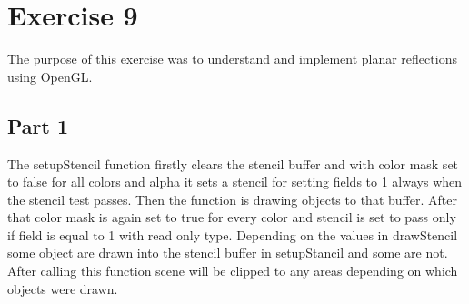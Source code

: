\chapter{Exercise 9}
The purpose of this exercise was to understand and implement planar reflections using OpenGL.

\section{Part 1}
The setupStencil function firstly clears the stencil buffer and with
color mask set to false for all colors and alpha it sets a stencil 
for setting fields to 1 always when the stencil test passes. 
Then the function is drawing objects to that buffer. After that
color mask is again set to true for every color and stencil is set
to pass only if field is equal to 1 with read only type.
\newline
Depending on the values in drawStencil some object are drawn into 
the stencil buffer in setupStancil and some are not. After calling
this function scene will be clipped to any areas depending on which
objects were drawn.

